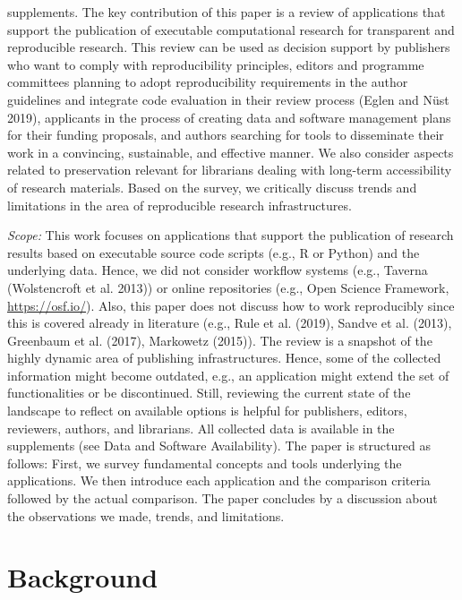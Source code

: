 \documentclass[onecolumn]{article}
\begin{document}
supplements. The key contribution of this paper is a review of
applications that support the publication of executable computational
research for transparent and reproducible research. This review can be
used as decision support by publishers who want to comply with
reproducibility principles, editors and programme committees planning to
adopt reproducibility requirements in the author guidelines and
integrate code evaluation in their review process (Eglen and Nüst 2019),
applicants in the process of creating data and software management plans
for their funding proposals, and authors searching for tools to
disseminate their work in a convincing, sustainable, and effective
manner. We also consider aspects related to preservation relevant for
librarians dealing with long-term accessibility of research materials.
Based on the survey, we critically discuss trends and limitations in the
area of reproducible research infrastructures.

\emph{Scope:} This work focuses on applications that support the
publication of research results based on executable source code scripts
(e.g., R or Python) and the underlying data. Hence, we did not consider
workflow systems (e.g., Taverna (Wolstencroft et al. 2013)) or online
repositories (e.g., Open Science Framework, \url{https://osf.io/}).
Also, this paper does not discuss how to work reproducibly since this is
covered already in literature (e.g., Rule et al. (2019), Sandve et al.
(2013), Greenbaum et al. (2017), Markowetz (2015)). The review is a
snapshot of the highly dynamic area of publishing infrastructures.
Hence, some of the collected information might become outdated, e.g., an
application might extend the set of functionalities or be discontinued.
Still, reviewing the current state of the landscape to reflect on
available options is helpful for publishers, editors, reviewers,
authors, and librarians. All collected data is available in the
supplements (see Data and Software Availability). The paper is
structured as follows: First, we survey fundamental concepts and tools
underlying the applications. We then introduce each application and the
comparison criteria followed by the actual comparison. The paper
concludes by a discussion about the observations we made, trends, and
limitations.

\hypertarget{background}{%
\section{Background}\label{background}}
\end{document}
